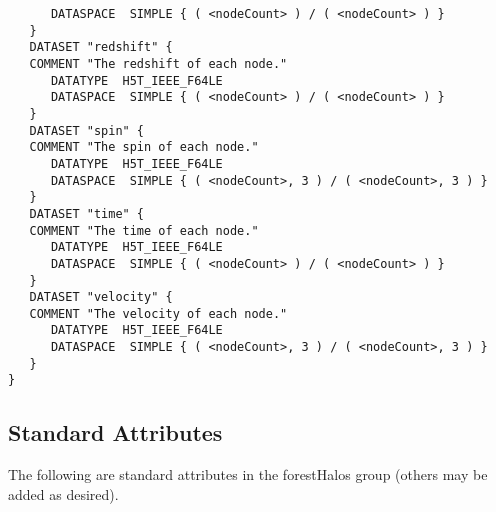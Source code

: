 \begin{verbatim}
      DATASPACE  SIMPLE { ( <nodeCount> ) / ( <nodeCount> ) }
   }
   DATASET "redshift" {
   COMMENT "The redshift of each node."
      DATATYPE  H5T_IEEE_F64LE
      DATASPACE  SIMPLE { ( <nodeCount> ) / ( <nodeCount> ) }
   }
   DATASET "spin" {
   COMMENT "The spin of each node."
      DATATYPE  H5T_IEEE_F64LE
      DATASPACE  SIMPLE { ( <nodeCount>, 3 ) / ( <nodeCount>, 3 ) }
   }
   DATASET "time" {
   COMMENT "The time of each node."
      DATATYPE  H5T_IEEE_F64LE
      DATASPACE  SIMPLE { ( <nodeCount> ) / ( <nodeCount> ) }
   }
   DATASET "velocity" {
   COMMENT "The velocity of each node."
      DATATYPE  H5T_IEEE_F64LE
      DATASPACE  SIMPLE { ( <nodeCount>, 3 ) / ( <nodeCount>, 3 ) }
   }
}
\end{verbatim}

\subsection{Standard Attributes}

The following are standard attributes in the {\normalfont \ttfamily forestHalos} group (others may be added as desired).

